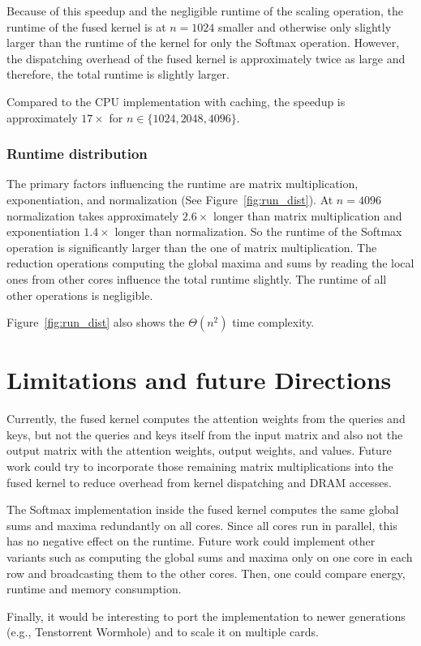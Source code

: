 \documentclass[conference]{IEEEtran}
\begin{document}
Because of this speedup and the negligible runtime of the scaling operation, the runtime of the fused kernel is at \(n=1024\) smaller and otherwise only slightly larger than the runtime of the kernel for only the Softmax operation. However, the dispatching overhead of the fused kernel is approximately twice as large and therefore, the total runtime is slightly larger.

Compared to the CPU implementation with caching, the speedup is approximately \(17\times\) for \(n \in \{1024, 2048, 4096\}\).

\subsubsection{\textbf{Runtime distribution}}
The primary factors influencing the runtime are matrix multiplication, exponentiation, and normalization (See Figure~\ref{fig:run_dist}). At \(n = 4096\) normalization takes approximately \(2.6 \times\) longer than matrix multiplication and exponentiation \(1.4 \times\) longer than normalization. So the runtime of the Softmax operation is significantly larger than the one of matrix multiplication. The reduction operations computing the global maxima and sums by reading the local ones from other cores influence the total runtime slightly. The runtime of all other operations is negligible.

Figure~\ref{fig:run_dist} also shows the \(\Theta(n^2)\) time complexity.

\section{Limitations and future Directions}
Currently, the fused kernel computes the attention weights from the queries and keys, but not the queries and keys itself from the input matrix and also not the output matrix with the attention weights, output weights, and values. Future work could try to incorporate those remaining matrix multiplications into the fused kernel to reduce overhead from kernel dispatching and DRAM accesses.

The Softmax implementation inside the fused kernel computes the same global sums and maxima redundantly on all cores. Since all cores run in parallel, this has no negative effect on the runtime. Future work could implement other variants such as computing the global sums and maxima only on one core in each row and broadcasting them to the other cores. Then, one could compare energy, runtime and memory consumption.

Finally, it would be interesting to port the implementation to newer generations (e.g., Tenstorrent Wormhole) and to scale it on multiple cards.



\end{document}
